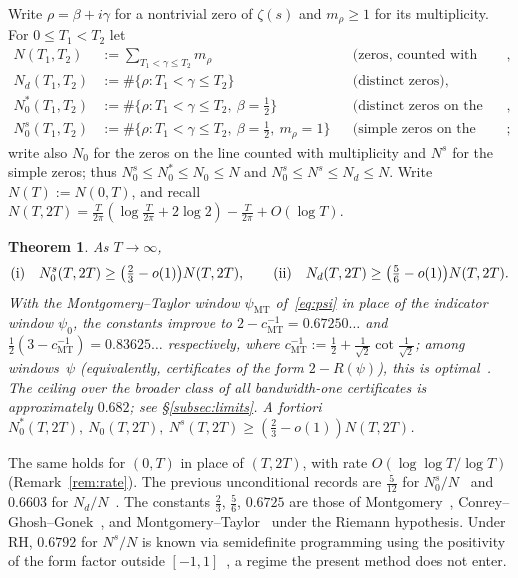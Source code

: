 \documentclass[11pt]{amsart}
\newtheorem{maintheorem}{Theorem}
\theoremstyle{definition}
\theoremstyle{remark}
\numberwithin{equation}{section}
\begin{document}
Write $\rho=\beta+i\gamma$ for a nontrivial zero of $\zeta(s)$ and $m_\rho\ge1$ for its multiplicity. For $0\le T_1<T_2$ let
\begin{align*}
N(T_1,T_2)&:=\textstyle\sum_{T_1<\gamma\le T_2} m_\rho
  &&\text{(zeros, counted with multiplicity)},\\
N_d(T_1,T_2)&:=\#\{\rho:T_1<\gamma\le T_2\}
  &&\text{(distinct zeros)},\\
N_0^{*}(T_1,T_2)&:=\#\{\rho:T_1<\gamma\le T_2,\ \beta=\tfrac12\}
  &&\text{(distinct zeros on the critical line)},\\
N_0^{s}(T_1,T_2)&:=\#\{\rho:T_1<\gamma\le T_2,\ \beta=\tfrac12,\ m_\rho=1\}
  &&\text{(simple zeros on the critical line)};
\end{align*}
write also $N_0$ for the zeros on the line counted with multiplicity and $N^{s}$ for the simple zeros; thus $N_0^{s}\le N_0^{*}\le N_0\le N$ and $N_0^{s}\le N^{s}\le N_d\le N$. Write $N(T):=N(0,T)$, and recall $N(T,2T)=\frac T{2\pi}(\log\frac T{2\pi}+2\log2)-\frac T{2\pi}+O(\log T)$.

\begin{maintheorem}\label{thm:main}
As $T\to\infty$,
\[
\text{\rm(i)}\quad N_0^{s}(T,2T)\ge\bigl(\tfrac23-o(1)\bigr)N(T,2T),
\qquad
\text{\rm(ii)}\quad N_d(T,2T)\ge\bigl(\tfrac56-o(1)\bigr)N(T,2T).
\]
With the Montgomery--Taylor window $\psi_{\mathrm{MT}}$ of~\eqref{eq:psi} in place of the indicator window $\psi_0$, the constants improve to $2-c_{\mathrm{MT}}^{-1}=0.67250\ldots$ and $\tfrac12(3-c_{\mathrm{MT}}^{-1})=0.83625\ldots$ respectively, where $c_{\mathrm{MT}}^{-1}:=\tfrac12+\tfrac1{\sqrt2}\cot\tfrac1{\sqrt2}$; among windows~$\psi$ (equivalently, certificates of the form $2-R(\psi)$), this is optimal~\cite[Cor.~14]{CCLM17}. The ceiling over the broader class of all bandwidth-one certificates is approximately $0.682$; see \S\ref{subsec:limits}. A fortiori $N_0^{*}(T,2T),\ N_0(T,2T),\ N^{s}(T,2T)\ge(\tfrac23-o(1))N(T,2T)$.
\end{maintheorem}

\noindent The same holds for $(0,T)$ in place of $(T,2T)$, with rate $O(\log\log T/\log T)$ (Remark~\ref{rem:rate}). The previous unconditional records are $\tfrac5{12}$ for $N_0^{s}/N$~\cite{PRZZ20} and $0.6603$ for $N_d/N$~\cite{Wu15}. The constants $\tfrac23$, $\tfrac56$, $0.6725$ are those of Montgomery~\cite{Mon73}, Conrey--Ghosh--Gonek~\cite[(1.2)]{CGG98}, and Montgomery--Taylor~\cite{Mon75} under the Riemann hypothesis. Under RH, $0.6792$ for $N^{s}/N$ is known via semidefinite programming using the positivity of the form factor outside $[-1,1]$~\cite{CGdL20}, a regime the present method does not enter.
\end{document}
